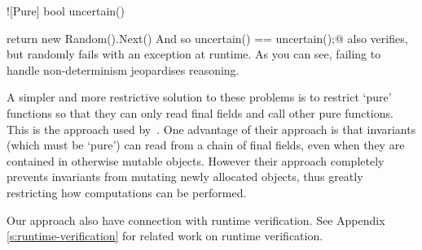 \Q![Pure] bool uncertain() {return new Random().Next() %
And so \Q@assert uncertain() == uncertain();@ also verifies, but randomly fails with an exception at runtime.
As you can see, failing to handle non-determinism jeopardises reasoning.

A simpler and more restrictive solution to these problems is to restrict `pure' functions so that they can only read final fields and call other pure functions. This is the approach used by~\cite{Flanagan06hybridtypes}. One advantage of their approach is that invariants (which must be `pure') can read from a chain of final fields, even when they are contained in otherwise mutable objects. However their approach completely prevents invariants from mutating newly allocated objects, thus greatly restricting how computations can be performed.

Our approach also have connection with runtime verification. See Appendix \ref{s:runtime-verification} for related work on runtime verification.




















%
%
%
%



}
